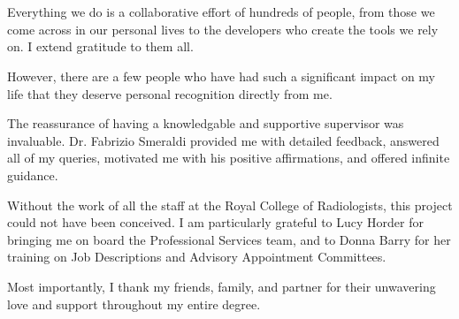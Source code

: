 \section*{}
\vspace{10pt}

Everything we do is a collaborative effort of hundreds of people, from those we come across in our personal lives to the developers who create the tools we rely on. I extend gratitude to them all. 

However, there are a few people who have had such a significant impact on my life that they deserve personal recognition directly from me.

The reassurance of having a knowledgable and supportive supervisor was invaluable. Dr. Fabrizio Smeraldi provided me with detailed feedback, answered all of my queries, motivated me with his positive affirmations, and offered infinite guidance. 

Without the work of all the staff at the Royal College of Radiologists, this project could not have been conceived. I am particularly grateful to Lucy Horder for bringing me on board the Professional Services team, and to Donna Barry for her training on Job Descriptions and Advisory Appointment Committees.

Most importantly, I thank my friends, family, and partner for their unwavering love and support throughout my entire degree.